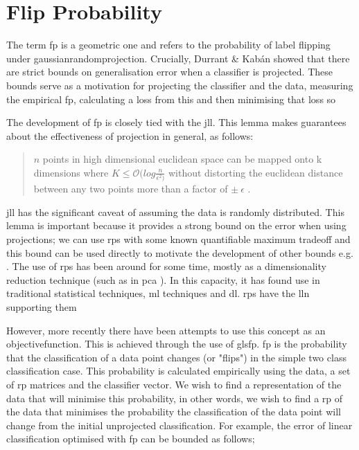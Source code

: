 \section{Flip Probability}

The term \gls{fp} is a geometric one and refers to the probability of label flipping under \gls{gaussianrandomprojection}. Crucially, Durrant \& Kab\'an showed that there are strict bounds on generalisation error when a classifier is projected. These bounds serve as a motivation for projecting the classifier and the data, measuring the empirical \gls{fp}, calculating a loss from this and then minimising that loss so \cite{bob_sharp_generalisation_error_bounds}

The development of \gls{fp} is closely tied with the \gls{jll}. This lemma makes guarantees about the effectiveness of projection in general, as follows:

\begin{quote}
    $n$ points in high dimensional euclidean space can be mapped onto k dimensions where $K \leq \mathcal{O}(log \frac{n}{\epsilon^{2})} $ without distorting the euclidean distance between any two points more than a factor of $\pm \: \epsilon$ \cite{jll_notes}.
\end{quote}

\gls{jll} has the significant caveat of assuming the data is randomly distributed. This lemma is important because it provides a strong bound on the error when using projections; we can use \gls{rp}s with some known quantifiable maximum tradeoff and this bound can be used directly to motivate the development of other bounds e.g. \cite{bob_sharp_generalisation_error_bounds}.  The use of \gls{rp}s has been around for some time, mostly as a dimensionality reduction technique (such as in \gls{pca} ). In this capacity, it has found use in traditional statistical techniques, \gls{ml} techniques and \gls{dl}. \gls{rp}s have the \gls{lln} supporting them 

However, more recently there have been attempts to use this concept as an \gls{objectivefunction}. This is achieved through the use of gls{fp}. \gls{fp} is the probability that the classification of a data point changes (or "flips") in the simple two class classification case. This probability is calculated empirically using the data, a set of \gls{rp} matrices and the classifier vector. We wish to find a representation of the data that will minimise this probability, in other words, we wish to find a \gls{rp} of the data that minimises the probability the classification of the data point will change from the initial unprojected classification.  For example, the error of linear classification optimised with \gls{fp} can be bounded as follows;

